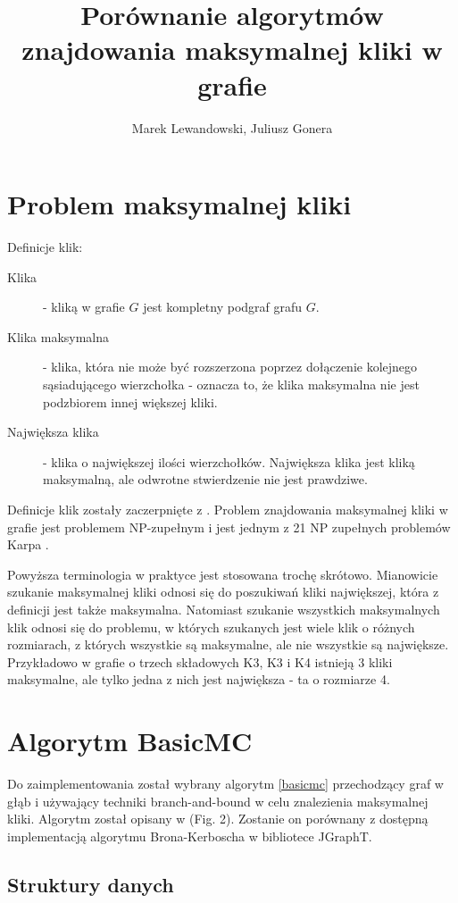 \documentclass[12pt, a4paper]{article}
\author{Marek Lewandowski, Juliusz Gonera}
\date{}
\title{Porównanie algorytmów znajdowania maksymalnej kliki w grafie}
\begin{document}
\maketitle

\section{Problem maksymalnej kliki}
\label{sec-1}
Definicje klik:
\begin{description}
\item[Klika] - kliką w grafie $G$ jest kompletny podgraf grafu $G$.
\item[Klika maksymalna] - klika, która nie może być rozszerzona poprzez dołączenie kolejnego sąsiadującego wierzchołka - oznacza to, że klika maksymalna nie jest podzbiorem innej większej kliki. 
\item[Największa klika] - klika o największej ilości wierzchołków. Największa klika jest kliką maksymalną, ale odwrotne stwierdzenie nie jest prawdziwe.
\end{description}

Definicje klik zostały zaczerpnięte z \cite{weissteinClique}. Problem znajdowania maksymalnej kliki w grafie jest problemem NP-zupełnym i jest jednym z 21 NP zupełnych problemów Karpa \cite{Kar72}.

Powyższa terminologia w praktyce jest stosowana trochę skrótowo. Mianowicie szukanie maksymalnej kliki odnosi się do poszukiwań kliki największej, która z definicji jest także maksymalna. Natomiast szukanie wszystkich maksymalnych klik odnosi się do problemu, w których szukanych jest wiele klik o różnych rozmiarach, z których wszystkie są maksymalne, ale nie wszystkie są największe. Przykładowo w grafie o trzech składowych K3, K3 i K4 istnieją 3 kliki maksymalne, ale tylko jedna z nich jest największa - ta o rozmiarze 4.

\section{Algorytm BasicMC}
\label{sec-2}
Do zaimplementowania został wybrany algorytm \ref{basicmc} przechodzący graf w głąb i używający techniki branch-and-bound w celu znalezienia maksymalnej kliki. Algorytm został opisany w \citep{bioinf} (Fig. 2). Zostanie on porównany z dostępną implementacją algorytmu Brona-Kerboscha w bibliotece JGraphT\citep{jgrapht}.

\subsection{Struktury danych}
\end{document}

